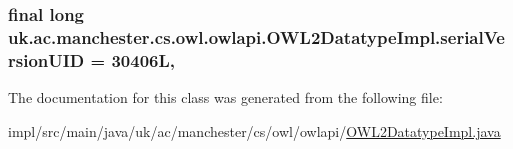 \hypertarget{classuk_1_1ac_1_1manchester_1_1cs_1_1owl_1_1owlapi_1_1_o_w_l2_datatype_impl_abd56ac5b646c9cf76efbeced9eaed112}{
\subsubsection[{serial\-Version\-U\-I\-D}]{\setlength{\rightskip}{0pt plus 5cm}final long uk.\-ac.\-manchester.\-cs.\-owl.\-owlapi.\-O\-W\-L2\-Datatype\-Impl.\-serial\-Version\-U\-I\-D = 30406\-L\hspace{0.3cm}{\ttfamily [static]}, {\ttfamily [private]}}}\label{classuk_1_1ac_1_1manchester_1_1cs_1_1owl_1_1owlapi_1_1_o_w_l2_datatype_impl_abd56ac5b646c9cf76efbeced9eaed112}


The documentation for this class was generated from the following file\-:\begin{DoxyCompactItemize}
\item 
impl/src/main/java/uk/ac/manchester/cs/owl/owlapi/\hyperlink{_o_w_l2_datatype_impl_8java}{O\-W\-L2\-Datatype\-Impl.\-java}\end{DoxyCompactItemize}
